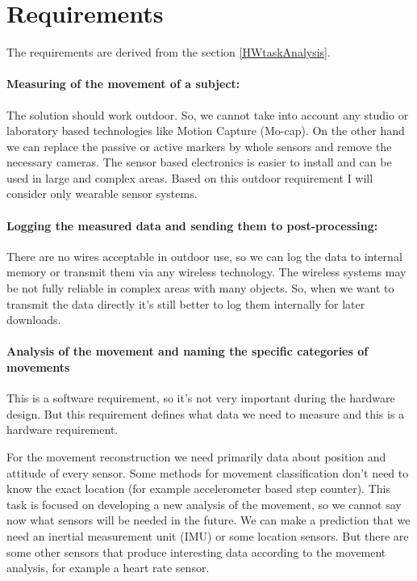 \documentclass[12pt,a4paper]{article}
\begin{document}
\section{Requirements}
The requirements are derived from the section \ref{HWtaskAnalysis}.

\paragraph{Measuring of the movement of a subject:} The solution should work outdoor. So, we cannot take into account any studio or laboratory based technologies like Motion Capture (Mo-cap). On the other hand we can replace the passive or active markers by whole sensors and remove the necessary cameras. The sensor based electronics is easier to install and can be used in large and complex areas. Based on this outdoor requirement I will consider only wearable sensor systems.

\paragraph{Logging the measured data and sending them to post-processing:} There are no wires acceptable in outdoor use, so we can log the data to internal memory or transmit them via any wireless technology. The wireless systems may be not fully reliable in complex areas with many objects. So, when we want to transmit the data directly it's still better to log them internally for later downloads.

\paragraph{Analysis of the movement and naming the specific categories of movements} This is a software requirement, so it's not very important during the hardware design. But this requirement defines what data we need to measure and this is a hardware requirement.

For the movement reconstruction we need primarily data about position and attitude of every sensor. Some methods for movement classification don't need to know the exact location (for example accelerometer based step counter). This task is focused on developing a new analysis of the movement, so we cannot say now what sensors will be needed in the future. We can make a prediction that we need an inertial measurement unit (IMU) or some location sensors. But there are some other sensors that produce interesting data according to the movement analysis, for example a heart rate sensor.
\end{document}
